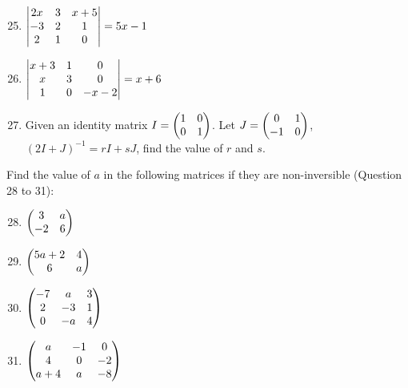 \documentclass{report}
\begin{document}
\begin{multicols}{2}
    \begin{enumerate}[wide, labelwidth=!, labelindent=0pt]
        \setcounter{enumi}{24}

        \item $\begin{vmatrix}
                      2x & 3 & x+5\\
                      -3 & 2 & 1\\
                      2 & 1 & 0
                  \end{vmatrix} = 5x - 1$

        \item $\begin{vmatrix}
                      x+3 & 1 & 0\\
                      x & 3 & 0\\
                      1 & 0 & -x-2
                  \end{vmatrix} = x + 6$

    \end{enumerate}

    \begin{enumerate}[wide, labelwidth=!, labelindent=0pt]
        \setcounter{enumi}{26}

        \item Given an identity matrix $I = \begin{pmatrix} 1 & 0\\ 0 & 1 \end{pmatrix}$. Let $J = \begin{pmatrix} 0 & 1\\ -1 & 0
                  \end{pmatrix}$, ${(2I+J)}^{-1} = rI + sJ$, find the value of $r$ and $s$.

    \end{enumerate}

    \noindent Find the value of $a$ in the following matrices if they are non-inversible (Question 28 to 31):

    \begin{enumerate}[wide, labelwidth=!, labelindent=0pt]
        \setcounter{enumi}{27}

        \item $\begin{pmatrix}
                      3 & a\\
                      -2 & 6
                  \end{pmatrix}$

        \item $\begin{pmatrix}
                      5a + 2 & 4\\
                      6 & a
                  \end{pmatrix}$

        \item $\begin{pmatrix}
                      -7 & a & 3\\
                      2 & -3 & 1\\
                      0 & -a & 4
                  \end{pmatrix}$

        \item $\begin{pmatrix}
                      a & -1 & 0\\
                      4 & 0 & -2\\
                      a+4 & a & -8
                  \end{pmatrix}$


\end{enumerate}
\end{multicols}
\end{document}
